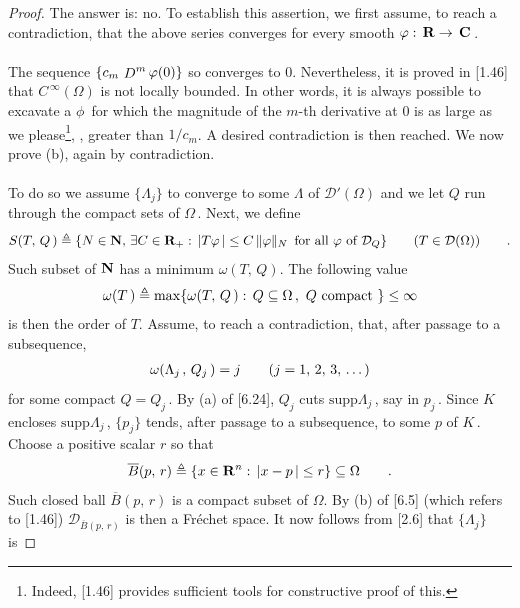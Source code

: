 \begin{proof}
The answer is: no. To establish this assertion, we first assume, to reach a contradiction, that the above series converges %
for every smooth $\varphi:\, \mathbf{R}\to\,\mathbf{C}\,$. \\
\\
The sequence $\{c_m\, \deriv[m]{\phi}(0)\}$ so converges to $0$. Nevertheless, it is proved in [1.46] that $C^{\,\infty}(\Omega)$ %
is not locally bounded. In other words, it is always possible to excavate a $\phi\,$ for which the magnitude of the $m$-th %
derivative at $0$ is as large as we please\footnote{Indeed, [1.46] provides sufficient tools for constructive proof of this.}, %
\eg, greater than $1/c_m$. A desired contradiction is then reached. We now prove (b), again by contradiction. \\
\\
To do so we assume $\{\Lambda_j\}$ to converge to some $\Lambda$ of $\mathcal{D}'(\Omega)$ and we let $Q$ run through the %
compact sets of $\Omega\,$. Next, we define
%
\begin{align}{\label{6_6_1}
  S(T,\, Q\,)\triangleq\{N\in \mathbf{N}, \, \exists C\in \mathbf{R}_+:\, \lvert T\varphi\, \rvert \leq C\, \| \varphi\|_N \,\text{ for all }\varphi\text{ of } \mathcal{D}_Q \}\qquad (T\in \mathcal{D}(\Omega))\qquad .
}\end{align}
%
Such subset of $\mathbf{N}$ has a minimum $\omega(T,\, Q)$. The following value
%
\begin{align}{\label{6_6_2}
  \omega (T\,) \triangleq\max\{ \omega(T,\, Q\,): \, Q\subseteq\Omega\, , \,\, Q \text{ compact }\}\leq \infty
}\end{align}
%
is then the order of $T$. Assume, to reach a contradiction, that, after passage to a subsequence,
%
\begin{align}{\label{6_6_3}
  \omega (\Lambda_{j\,},\, Q_j\,) =j\qquad (j=1,\, 2,\, 3,\, \dots)
}\end{align}
%
for some compact $Q=Q_j\,$. By (a) of [6.24], $Q_j$ cuts $\text{supp}\Lambda_j\,$, say in $p_j\,$. Since $K$ encloses %
$\text{supp}\Lambda_j\,$, $\{p_j\}$ tends, after passage to a subsequence, to some $p$ of $K\,$. Choose a positive scalar $r$ %
so that
%
\begin{align}{\label{6_6_5}
  \overline{B}(p,\, r)\triangleq\{ x\in \mathbf{R}^n:\, \lvert x-p\,\rvert\leq r\}\subseteq\Omega \qquad .
}\end{align}
%
Such closed ball $\overline{B}(p,\, r)$ is a compact subset of $\Omega$. By (b) of [6.5] (which refers to [1.46]) %
$\mathcal{D}_{\overline{B}(p,\, r)}$ is then a Fréchet space. It now follows from [2.6] that $\{\Lambda_j\}$ is %

\end{proof}
